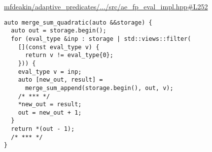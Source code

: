 \href{https://github.com/mfdeakin/adaptive\_predicates/blob/main/src/ae_fp_eval_impl.hpp#L252}{mfdeakin/adaptive\_predicates/.../src/ae\_fp\_eval\_impl.hpp\#L252}
\begin{lstlisting}[basicstyle=\small\ttfamily]
auto merge_sum_quadratic(auto &&storage) {
  auto out = storage.begin();
  for (eval_type &inp : storage | std::views::filter(
    [](const eval_type v) {
      return v != eval_type{0};
    })) {
    eval_type v = inp;
    auto [new_out, result] =
      merge_sum_append(storage.begin(), out, v);
    /* *** */
    *new_out = result;
    out = new_out + 1;
  }
  return *(out - 1);
  /* *** */
}
\end{lstlisting}
